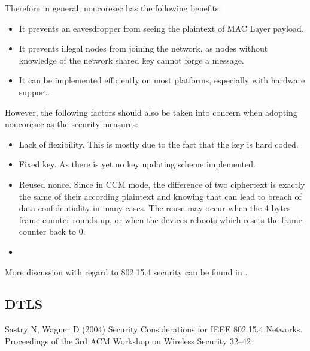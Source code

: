 Therefore in general, noncoresec has the following benefits:
\begin{itemize}
\item It prevents an eavesdropper from seeing the plaintext of MAC Layer payload.
\item It prevents illegal nodes from joining the network, as nodes without knowledge of the network shared key cannot forge a message.
\item It can be implemented efficiently on most platforms, especially with hardware support.
\end{itemize}

However, the following factors should also be taken into concern when adopting noncoresec as the security measures:
\begin{itemize}
\item Lack of flexibility. This is mostly due to the fact that the key is hard coded.
\item Fixed key. As there is yet no key updating scheme implemented.
\item Reused nonce. Since in CCM mode, the difference of two ciphertext is exactly the same of their according plaintext and knowing that can lead to breach of data confidentiality in many cases. The reuse may occur when the 4 bytes frame counter rounds up, or when the devices reboots which resets the frame counter back to $0$.
\item 
\end{itemize}

More discussion with regard to 802.15.4 security can be found in \cite{802154sec}.

\subsection{DTLS}




\begin{thebibliography}{99.}
 Sastry N, Wagner D (2004) Security Considerations for IEEE 802.15.4 Networks. Proceedings of the 3rd ACM Workshop on Wireless Security 32--42
\end{thebibliography}
